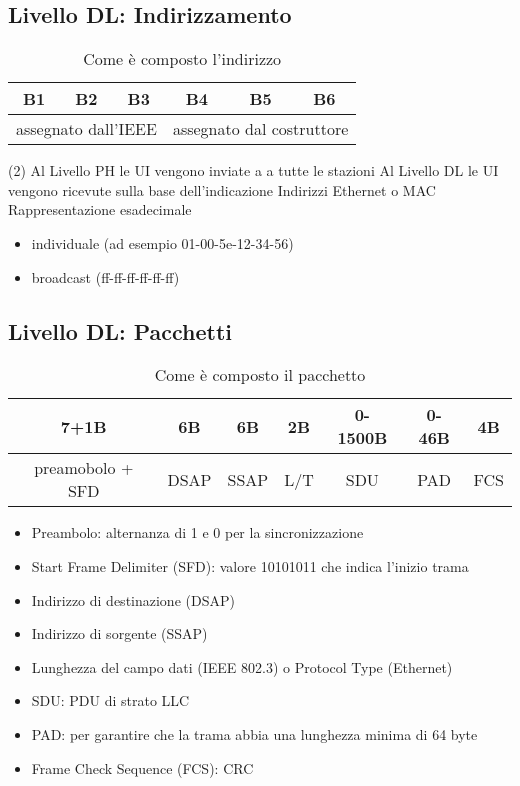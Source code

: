 \documentclass{book}
\begin{document}
\subsection{Livello DL: Indirizzamento}
\begin{table}[h!]
	\centering
	\begin{tabular}{|c||c||c||c||c||c|}
		\hline
		B1&B2&B3&B4&B5&B6\\\hline
		\multicolumn{3}{c}{assegnato dall'IEEE}&\multicolumn{3}{c}{assegnato
		dal costruttore}
	\end{tabular}
	\caption{Come è composto l'indirizzo}
\end{table}
\begin{tasks}(2)
	\task Al Livello PH le UI vengono inviate a a tutte le stazioni
	\task Al Livello DL le UI vengono ricevute sulla base dell'indicazione
	\task Indirizzi Ethernet o MAC
	\task Rappresentazione esadecimale
	\begin{itemize}
		\item individuale (ad esempio 01-00-5e-12-34-56)
		\item broadcast (ff-ff-ff-ff-ff-ff)
	\end{itemize}
\end{tasks}
\subsection{Livello DL: Pacchetti}
\begin{table}[h!]
	\centering
	\begin{tabular}{|c|c|c|c|c|c|c|}
		\multicolumn{1}{c}{7+1B}&\multicolumn{1}{c}{6B}&\multicolumn{1}{c}{6B}&\multicolumn{1}{c}{2B}&\multicolumn{1}{c}{0-1500B}&\multicolumn{1}{c}{0-46B}&\multicolumn{1}{c}{4B}\\
		\hline
	preamobolo + SFD&DSAP&SSAP&L/T&SDU&PAD&FCS\\\hline
		
	\end{tabular}
	\caption{Come è composto il pacchetto}
\end{table}
\begin{itemize}
	\item Preambolo: alternanza di 1 e 0 per la sincronizzazione
	\item Start Frame Delimiter (SFD): valore 10101011 che indica l'inizio
		trama
	\item Indirizzo di destinazione (DSAP)
	\item Indirizzo di sorgente (SSAP)
	\item Lunghezza del campo dati (IEEE 802.3) o Protocol Type (Ethernet)
	\item SDU: PDU di strato LLC
	\item PAD: per garantire che la trama abbia una lunghezza minima di 64 byte
	\item Frame Check Sequence (FCS): CRC
\end{itemize}
\end{document}

